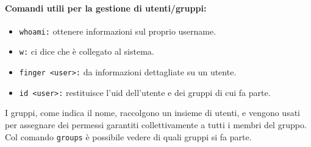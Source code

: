 \documentclass[a4paper]{report}
\begin{document}
\paragraph{Comandi utili per la gestione di utenti/gruppi:}
\begin{itemize}
\item \texttt{whoami:} ottenere informazioni sul proprio username.
\item \texttt{w:} ci dice che è collegato al sistema.
\item \texttt{finger <user>:} da informazioni dettagliate su un utente.
\item \texttt{id <user>:} restituisce l'uid dell'utente e dei gruppi di cui fa parte.
\end{itemize}
I gruppi, come indica il nome, raccolgono un insieme di utenti, e vengono usati per
assegnare dei permessi garantiti collettivamente a tutti i membri del gruppo. Col
comando \texttt{groups} è possibile vedere di quali gruppi si fa parte.\\
\end{document}
